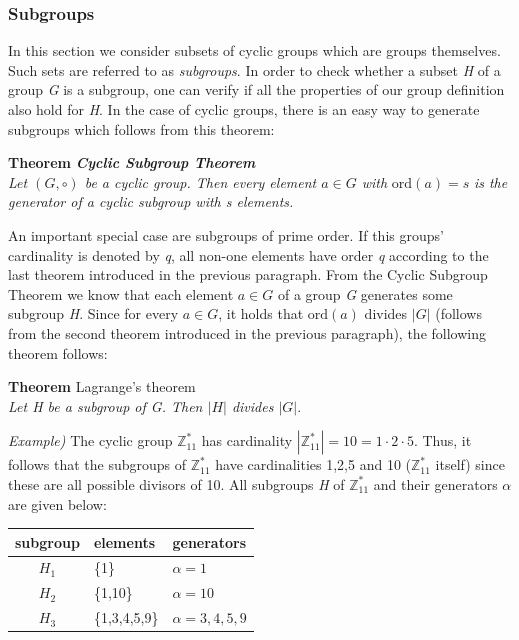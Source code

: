 \documentclass[11pt, a4paper]{article}
\begin{document}
\subsubsection{Subgroups}
In this section we consider subsets of cyclic groups which are groups themselves. Such sets are referred to as \textit{subgroups}. In order to check whether a subset \textit{H} of a group \textit{G} is a subgroup, one can verify if all the properties of our group definition also hold for \textit{H}. In the case of cyclic groups, there is an easy way to generate subgroups which follows from this theorem:
\begin{framed}
    \hfill\break\textbf{Theorem} \textit{\textbf{Cyclic Subgroup Theorem}}\\
    \textit{Let $(G,\circ)$ be a cyclic group. Then every element $a\in G$ with} $\text{ord}(a)=s$ \textit{is the generator of a cyclic subgroup with s elements.}
\end{framed}
\hfill\break
An important special case are subgroups of prime order. If this groups' cardinality is denoted by \textit{q}, all non-one elements have order \textit{q} according to the last theorem introduced in the previous paragraph. From the Cyclic Subgroup Theorem we know that each element $a\in G$ of a group \textit{G} generates some subgroup \textit{H}. Since for every $a\in G$, it holds that $\text{ord}(a)$ divides $|G|$ (follows from the second theorem introduced in the previous paragraph), the following theorem follows:
\begin{center}
    \begin{framed}
        \textbf{Theorem} Lagrange's theorem\\
        \textit{Let H be a subgroup of G. Then $|H|$ divides $|G|$}.
    \end{framed}
\end{center}
\textit{Example)} The cyclic group $\mathbb{Z}_{11}^*$ has cardinality $|\mathbb{Z}_{11}^*|=10=1\cdot2\cdot5$. Thus, it follows that the subgroups of $\mathbb{Z}_{11}^*$ have cardinalities 1,2,5 and 10 ($\mathbb{Z}_{11}^*$ itself) since these are all possible divisors of 10. All subgroups \textit{H} of $\mathbb{Z}_{11}^*$ and their generators $\alpha$ are given below:
\begin{center}
    \begin{tabular}{cll}
        subgroup&elements&generators\\
        \hline
        $H_1$&\{1\}&$\alpha=1$\\
        $H_2$&\{1,10\}&$\alpha=10$\\
        $H_3$&\{1,3,4,5,9\}&$\alpha=3,4,5,9$
    \end{tabular}
\end{center}
\end{document}

